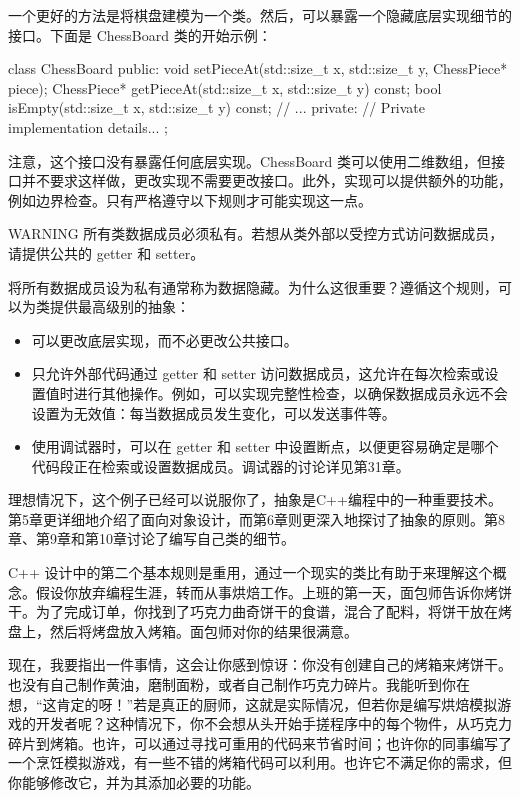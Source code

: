 一个更好的方法是将棋盘建模为一个类。然后，可以暴露一个隐藏底层实现细节的接口。下面是 ChessBoard 类的开始示例：

\begin{cpp}
class ChessBoard
{
    public:
        void setPieceAt(std::size_t x, std::size_t y, ChessPiece* piece);
        ChessPiece* getPieceAt(std::size_t x, std::size_t y) const;
        bool isEmpty(std::size_t x, std::size_t y) const;
        // ...
    private:
        // Private implementation details...
};
\end{cpp}

注意，这个接口没有暴露任何底层实现。ChessBoard 类可以使用二维数组，但接口并不要求这样做，更改实现不需要更改接口。此外，实现可以提供额外的功能，例如边界检查。只有严格遵守以下规则才可能实现这一点。

\begin{myWarning}{WARNING}
所有类数据成员必须私有。若想从类外部以受控方式访问数据成员，请提供公共的 getter 和 setter。
\end{myWarning}

将所有数据成员设为私有通常称为数据隐藏。为什么这很重要？遵循这个规则，可以为类提供最高级别的抽象：

\begin{itemize}
\item
可以更改底层实现，而不必更改公共接口。

\item
只允许外部代码通过 getter 和 setter 访问数据成员，这允许在每次检索或设置值时进行其他操作。例如，可以实现完整性检查，以确保数据成员永远不会设置为无效值：每当数据成员发生变化，可以发送事件等。

\item
使用调试器时，可以在 getter 和 setter 中设置断点，以便更容易确定是哪个代码段正在检索或设置数据成员。调试器的讨论详见第31章。
\end{itemize}

理想情况下，这个例子已经可以说服你了，抽象是C++编程中的一种重要技术。第5章更详细地介绍了面向对象设计，而第6章则更深入地探讨了抽象的原则。第8章、第9章和第10章讨论了编写自己类的细节。


C++ 设计中的第二个基本规则是重用，通过一个现实的类比有助于来理解这个概念。假设你放弃编程生涯，转而从事烘焙工作。上班的第一天，面包师告诉你烤饼干。为了完成订单，你找到了巧克力曲奇饼干的食谱，混合了配料，将饼干放在烤盘上，然后将烤盘放入烤箱。面包师对你的结果很满意。

现在，我要指出一件事情，这会让你感到惊讶：你没有创建自己的烤箱来烤饼干。也没有自己制作黄油，磨制面粉，或者自己制作巧克力碎片。我能听到你在想，“这肯定的呀！”若是真正的厨师，这就是实际情况，但若你是编写烘焙模拟游戏的开发者呢？这种情况下，你不会想从头开始手搓程序中的每个物件，从巧克力碎片到烤箱。也许，可以通过寻找可重用的代码来节省时间；也许你的同事编写了一个烹饪模拟游戏，有一些不错的烤箱代码可以利用。也许它不满足你的需求，但你能够修改它，并为其添加必要的功能。

